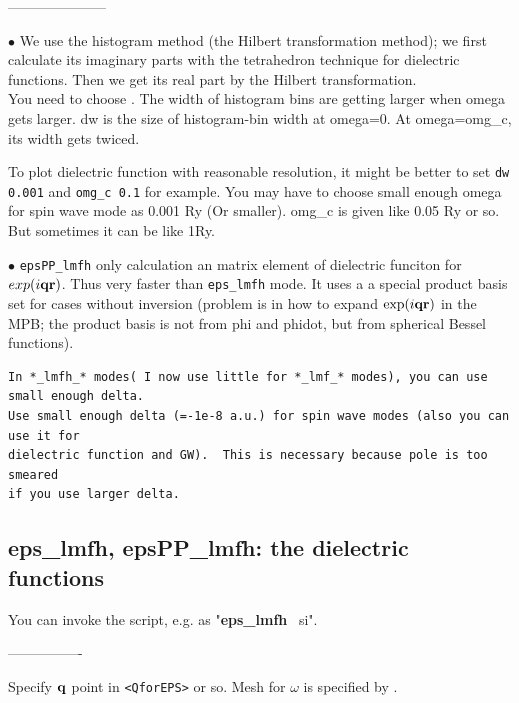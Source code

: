 \documentclass[a4paper,10pt,epsf,fleqn]{article}
\newcommand{\keyw}[1]{\fbox{\tt #1}}
\newcommand{\bfq}{{\bf q}}
\newcommand{\bfr}{{\bf r}}
\newcommand{\exe}[1]{{\bf #1}}
\newcommand{\raw}[1]{{\tt #1}}
\begin{document}
---------------------

\noindent $\bullet$ We use the histogram method (the Hilbert
transformation method); we first calculate its imaginary parts
  with the tetrahedron technique for dielectric functions. 
  Then we get its real part by the Hilbert transformation.\\
  You need to choose \keyw{dw,omg\_c}. 
  The width of histogram bins are getting larger when omega gets larger.
  dw is the size of histogram-bin width at omega=0. 
  At omega=omg\_c, its width gets twiced.

  To plot dielectric function with reasonable resolution, it might be
  better to set \verb#dw 0.001# and \verb#omg_c 0.1# for example.
  You may have to choose small enough omega 
  for spin wave mode as 0.001 Ry (Or smaller).
  omg\_c is given like 0.05 Ry or so. But sometimes it can be like 1Ry.

  
\noindent $\bullet$ \raw{epsPP\_lmfh} only calculation an matrix element 
  of dielectric funciton for $exp(i \bfq \bfr)$. Thus very faster 
  than \raw{eps\_lmfh} mode. 
  It uses a a special product basis set for cases without inversion
  (problem is in how to expand $\exp(i \bfq \bfr)$ in the MPB;
   the product basis is not from phi and phidot, 
    but from spherical Bessel functions).\\



\begin{verbatim}
In *_lmfh_* modes( I now use little for *_lmf_* modes), you can use small enough delta.
Use small enough delta (=-1e-8 a.u.) for spin wave modes (also you can use it for 
dielectric function and GW).  This is necessary because pole is too smeared 
if you use larger delta.
\end{verbatim}



\subsection{eps\_lmfh, epsPP\_lmfh: the dielectric functions}

You can invoke the script, e.g. as "\exe{eps\_lmfh} \ si".

----------------

Specify ${\bf q}$ point in \verb#<QforEPS># or so.
Mesh for $\omega$ is specified by \keyw{dw, omg\_c}.
\end{document}

